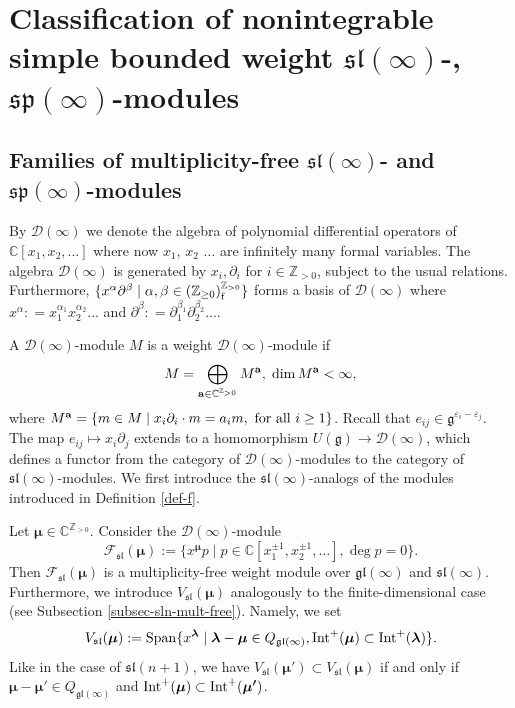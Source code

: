 \documentclass[12pt]{amsart}
\newcommand{\C}{{\mathbb C}}
\def\gg{\mathfrak{g}}
\def\gl{\mathfrak{l}}
\def\gs{\mathfrak{s}}
\begin{document}
\section{Classification of nonintegrable simple bounded weight $\mathfrak{sl} (\infty)$-, $\mathfrak{sp} (\infty)$-modules} \label{sec-class-nonint}

\subsection{Families of multiplicity-free  $\mathfrak{sl} (\infty)$- and $\mathfrak{sp} (\infty)$-modules}

By ${\mathcal D} (\infty)$ we denote the algebra of polynomial differential operators of $\C [x_1,x_2,...]$ where now $x_1$, $x_2$ $\dots$ are infinitely many formal variables. The algebra ${\mathcal D} (\infty)$ is generated by $x_i, \partial_i$ for $i\in \mathbb{Z}_{>0}$, subject to the usual relations. Furthermore, $\{ x^{\alpha} \partial^{\beta} \; | \; \alpha, \beta \in ({\mathbb Z}_{\geq 0})_{\rm f}^{{\mathbb Z}_{ > 0}}\}$ forms a basis of ${\mathcal D} (\infty)$ where $x^{\alpha}: = x_1^{\alpha_1}x_2^{\alpha_2}...$ and $\partial^{\beta}: = \partial_1^{\beta_1}\partial_2^{\beta_2}...$.


A  ${\mathcal D} (\infty)$-module $M$ is a weight  ${\mathcal D} (\infty)$-module if 
$$
M = \bigoplus_{{\bf a} \in {\C}^{{\mathbb Z}_{>0}}} M^{\bf a},\;  \dim M^{\bf a} < \infty,
$$
where $M^{\bf a} = \{ m \in M \; | \; x_i \partial_i \cdot m = a_i m, \mbox{ for all }i \geq 1\}$. Recall that  $e_{ij}  \in \gg^{\varepsilon_i - \varepsilon_j}$. The map $e_{ij}\mapsto x_i \partial_j$ extends to a homomorphism $U(\gg) \to {\mathcal D} (\infty)$, which defines a functor from the category of  ${\mathcal D} (\infty)$-modules to the category of  $\mathfrak{sl} (\infty)$-modules. We first introduce the $\mathfrak{sl} (\infty)$-analogs of the modules introduced in Definition \ref{def-f}. 


Let $\boldsymbol{\mu} \in \C^{{\mathbb Z}_{>0}}$. Consider the ${\mathcal D} (\infty)$-module
$$
{\mathcal F}_{\mathfrak{sl}} (\boldsymbol{\mu} ):= \{ { x}^{\boldsymbol{\mu}} p \; | \; p \in \C [x_1^{\pm 1}, x_2^{\pm 1}, \dots], \deg p = 0\}.
$$
Then ${\mathcal F}_{\mathfrak{sl}} (\boldsymbol{\mu} )$ is a multiplicity-free weight module over $\gg \gl (\infty)$ and $\gs \gl (\infty)$.
Furthermore, we introduce $V_{\mathfrak{sl}} (\boldsymbol{\mu})$ analogously to the finite-dimensional case (see Subsection \ref{subsec-sln-mult-free}).  Namely,  we set
$$
V_{\mathfrak{sl}} (\boldsymbol{\mu}) := {\rm Span} \{ { x}^{\boldsymbol{\lambda}} \; | \; \boldsymbol{\lambda} - \boldsymbol{\mu} \in Q_{\mathfrak{gl} (\infty)}, {\rm Int}^+ (\boldsymbol{\mu}) \subset  {\rm Int}^+ (\boldsymbol{\lambda}) \}.
$$
Like in the case of $\mathfrak{sl}({n+1})$, we have  $V_{\mathfrak{sl}} (\boldsymbol{\mu'}) \subset V_{\mathfrak{sl}} (\boldsymbol{\mu})$ if and only if $\boldsymbol{\mu} - \boldsymbol{\mu'} \in Q_{\mathfrak{gl} (\infty)}$ and ${\rm Int}^+ (\boldsymbol{\mu}) \subset  {\rm Int}^+ (\boldsymbol{\mu'})$. 
\end{document}
